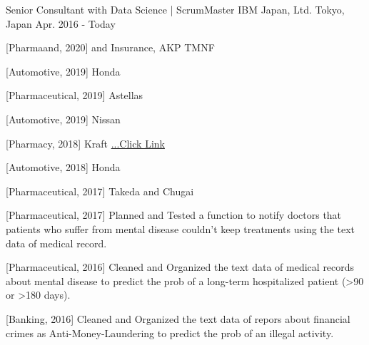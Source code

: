 

\begin{cventries}

  \cventry
    {Senior Consultant with Data Science | ScrumMaster} %
    {IBM Japan, Ltd.} %
    {Tokyo, Japan} %
    {Apr. 2016 - Today} %
    {
      \begin{cvitems} %
        \item {[Pharmaand, 2020] and Insurance, AKP TMNF}
        \item {[Automotive, 2019] Honda}
        \item {[Pharmaceutical, 2019] Astellas}
        \item {[Automotive, 2019] Nissan}
        \item {[Pharmacy, 2018] Kraft \href{https://www.ibm.com/think/jp-ja/business/sakura-ai/}{...Click Link}}
        \item {[Automotive, 2018] Honda}
        \item {[Pharmaceutical, 2017] Takeda and Chugai}
        \item {[Pharmaceutical, 2017] Planned and Tested a function to notify doctors that patients who suffer from mental disease couldn't keep treatments using the text data of medical record.}
        \item {[Pharmaceutical, 2016] Cleaned and Organized the text data of medical records about mental disease to predict the prob of a long-term hospitalized patient (>90 or >180 days).}
        \item {[Banking, 2016] Cleaned and Organized the text data of repors about financial crimes as Anti-Money-Laundering to predict the prob of an illegal activity.}
      \end{cvitems}
    }
\end{cventries}
